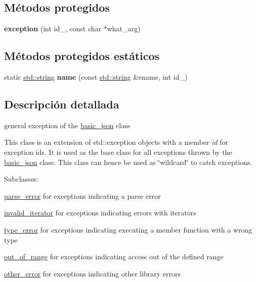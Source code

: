 \subsection*{Métodos protegidos}
\begin{DoxyCompactItemize}
\item 
\mbox{\label{classnlohmann_1_1detail_1_1exception_ae323ad0d53bc724414c2233164e65657}} 
{\bfseries exception} (int id\+\_\+, const char $\ast$what\+\_\+arg)
\end{DoxyCompactItemize}
\subsection*{Métodos protegidos estáticos}
\begin{DoxyCompactItemize}
\item 
\mbox{\label{classnlohmann_1_1detail_1_1exception_abf41a7e9178356314082284e6cfea278}} 
static \mbox{\hyperlink{namespacenlohmann_1_1detail_a1ed8fc6239da25abcaf681d30ace4985ab45cffe084dd3d20d928bee85e7b0f21}{std\+::string}} {\bfseries name} (const \mbox{\hyperlink{namespacenlohmann_1_1detail_a1ed8fc6239da25abcaf681d30ace4985ab45cffe084dd3d20d928bee85e7b0f21}{std\+::string}} \&ename, int id\+\_\+)
\end{DoxyCompactItemize}


\subsection{Descripción detallada}
general exception of the \mbox{\hyperlink{classnlohmann_1_1basic__json}{basic\+\_\+json}} class 

This class is an extension of {\ttfamily std\+::exception} objects with a member {\itshape id} for exception ids. It is used as the base class for all exceptions thrown by the \mbox{\hyperlink{classnlohmann_1_1basic__json}{basic\+\_\+json}} class. This class can hence be used as \char`\"{}wildcard\char`\"{} to catch exceptions.

Subclasses\+:
\begin{DoxyItemize}
\item \mbox{\hyperlink{classnlohmann_1_1detail_1_1parse__error}{parse\+\_\+error}} for exceptions indicating a parse error
\item \mbox{\hyperlink{classnlohmann_1_1detail_1_1invalid__iterator}{invalid\+\_\+iterator}} for exceptions indicating errors with iterators
\item \mbox{\hyperlink{classnlohmann_1_1detail_1_1type__error}{type\+\_\+error}} for exceptions indicating executing a member function with a wrong type
\item \mbox{\hyperlink{classnlohmann_1_1detail_1_1out__of__range}{out\+\_\+of\+\_\+range}} for exceptions indicating access out of the defined range
\item \mbox{\hyperlink{classnlohmann_1_1detail_1_1other__error}{other\+\_\+error}} for exceptions indicating other library errors
\end{DoxyItemize}

